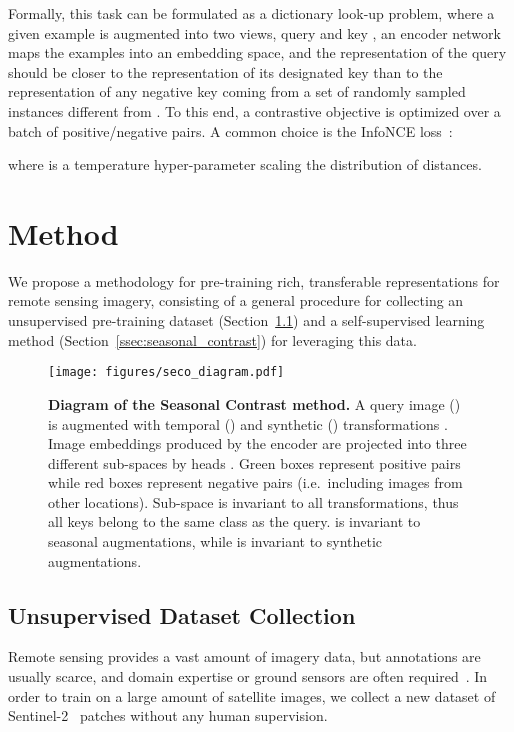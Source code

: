 \documentclass[10pt,twocolumn,letterpaper]{article}
\begin{document}
Formally, this task can be formulated as a dictionary look-up problem, where a given example  is augmented into two views, query  and key , an encoder network  maps the examples into an embedding space, and the representation of the query  should be closer to the representation of its designated key  than to the representation of any negative key  coming from a set of randomly sampled instances different from . To this end, a contrastive objective is optimized over a batch of positive/negative pairs. A common choice is the InfoNCE loss~\cite{oord2018representation}:



where  is a temperature hyper-parameter scaling the distribution of distances.



\section{Method}
We propose a methodology for pre-training rich, transferable representations for remote sensing imagery, consisting of a general procedure for collecting an unsupervised pre-training dataset (Section~\ref{ssec:dataset_collection}) and a self-supervised learning method (Section~\ref{ssec:seasonal_contrast}) for leveraging this data.

\begin{figure*}[t]
    \begin{center}
    \texttt{[image: figures/seco\_diagram.pdf]}
    \end{center}
    \caption{\textbf{Diagram of the Seasonal Contrast method.} A query image () is augmented with temporal () and synthetic () transformations . Image embeddings produced by the encoder  are projected into three different sub-spaces by heads . Green boxes represent positive pairs while red boxes represent negative pairs (i.e.\ including images from other locations). Sub-space  is invariant to all transformations, thus all keys belong to the same class as the query.  is invariant to seasonal augmentations, while  is invariant to synthetic augmentations.}
    \label{fig:diagram}
\end{figure*}

\subsection{Unsupervised Dataset Collection}
\label{ssec:dataset_collection}
Remote sensing provides a vast amount of imagery data, but annotations are usually scarce, and domain expertise or ground sensors are often required~\cite{jean2016combining}. In order to train on a large amount of satellite images, we collect a new dataset of Sentinel-2~\cite{drusch2012sentinel} patches without any human supervision.
\end{document}
